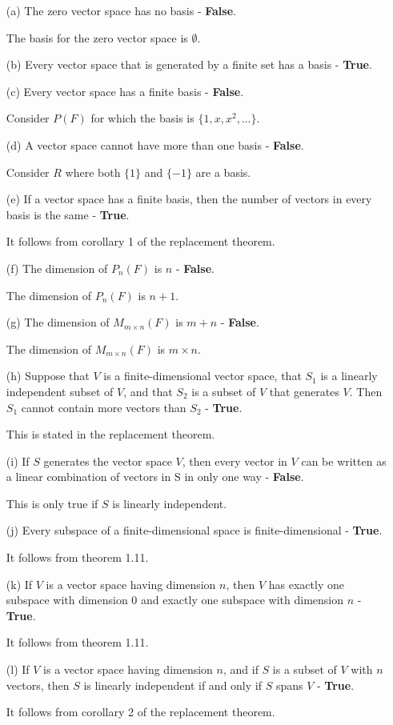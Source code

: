 \documentclass{article}
\begin{document}
\begin{enumerate}
    \item[(a)] The zero vector space has no basis - \textbf{False}.

    The basis for the zero vector space is $\emptyset$.
    \item[(b)] Every vector space that is generated by a finite set has a basis - \textbf{True}.
    \item[(c)] Every vector space has a finite basis - \textbf{False}.

    Consider $P(F)$ for which the basis is $\{1,x,x^2,\dots\}$.
    \item[(d)] A vector space cannot have more than one basis - \textbf{False}.
    
    Consider $R$ where both $\{1\}$ and $\{-1\}$ are a basis.
    \item[(e)] If a vector space has a finite basis, then the number of vectors in every basis is the same - \textbf{True}.

    It follows from corollary 1 of the replacement theorem.
    \item[(f)] The dimension of $P_n(F)$ is $n$ - \textbf{False}.

    The dimension of $P_n(F)$ is $n + 1$.
    \item[(g)] The dimension of $M_{m\times n}(F)$ is $m + n$ - \textbf{False}.

    The dimension of $M_{m\times n}(F)$ is $m \times n$.
    \item[(h)] Suppose that $V$ is a finite-dimensional vector space, that $S_1$ is a linearly independent subset of $V$, and that $S_2$ is a subset of $V$ that generates $V$. Then $S_1$ cannot contain more vectors than $S_2$ - \textbf{True}.

    This is stated in the replacement theorem.
    \item[(i)] If $S$ generates the vector space $V$, then every vector in $V$ can be written as a linear combination of vectors in S in only one way - \textbf{False}.

    This is only true if $S$ is linearly independent.
    \item[(j)] Every subspace of a finite-dimensional space is finite-dimensional - \textbf{True}.

    It follows from theorem 1.11.
    \item[(k)] If $V$ is a vector space having dimension $n$, then $V$ has exactly one subspace with dimension 0 and exactly one subspace with dimension $n$ - \textbf{True}.

    It follows from theorem 1.11.
    \item[(l)] If $V$ is a vector space having dimension $n$, and if $S$ is a subset of $V$ with $n$ vectors, then $S$ is linearly independent if and only if $S$ spans $V$ - \textbf{True}.

    It follows from corollary 2 of the replacement theorem.
\end{enumerate}
\end{document}
